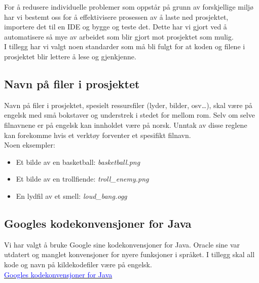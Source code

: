 \documentclass[12pt]{report}
\begin{document}
For {\aa} redusere individuelle problemer som oppst{\aa}r p{\aa} grunn av forskjellige milj{\o} har vi bestemt oss for
{\aa} effektivisere prosessen av {\aa} laste ned prosjektet, importere det til en IDE og bygge og teste det. Dette har
vi gjort ved {\aa} automatisere s{\aa} mye av arbeidet som blir gjort mot prosjektet som mulig.\\

I tillegg har vi valgt noen standarder som m{\aa} bli fulgt for at koden og filene i prosjektet blir lettere {\aa} lese
og gjenkjenne.\\

\subsection*{Navn p{\aa} filer i prosjektet}

Navn p{\aa} filer i prosjektet, spesielt ressursfiler (lyder, bilder, osv{\dots}), skal v{\ae}re p{\aa} engelsk med
sm{\aa} bokstaver og understrek i stedet for mellom rom. Selv om selve filnavnene er p{\aa} engelsk kan innholdet
v{\ae}re p{\aa} norsk. Unntak av disse reglene kan forekomme hvis et verkt{\o}y forventer et spesifikt filnavn.\\

Noen eksempler:
\begin{itemize}
\item Et bilde av en basketball: \textit{basketball.png}
\item Et bilde av en trollfiende: \textit{troll\_enemy.png}
\item En lydfil av et smell: \textit{loud\_bang.ogg}
\end{itemize}

\subsection*{Googles kodekonvensjoner for Java}

Vi har valgt {\aa} bruke Google sine kodekonvensjoner for Java. Oracle sine var utdatert og manglet konvensjoner for
nyere funksjoner i spr{\aa}ket. I tillegg skal all kode og navn p{\aa} kildekodefiler v{\ae}re p{\aa} engelsk.\\

\href{https://google.github.io/styleguide/javaguide.html}{\textcolor{blue}{Googles kodekonvensjoner for Java}}
\end{document}
